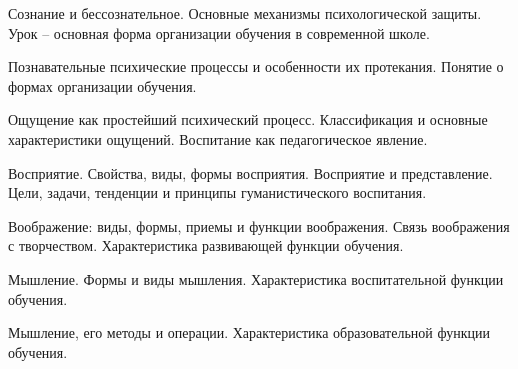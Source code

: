 \documentclass[
	14pt,
	a4paper,
	]
	{scrartcl}
\begin{document}
\newpage


\shapk
{}
\setcounter{zad}{0}

\vfill
\z 	Сознание и бессознательное. Основные механизмы психологической защиты.
 \vfill
\z 	Урок – основная форма организации обучения в современной школе.
 \vfill

\vfill

\newpage


\shapk
{}
\setcounter{zad}{0}

\vfill
\z 	Познавательные психические процессы и особенности их протекания.
 \vfill
\z 	Понятие о формах организации обучения.
 \vfill

\vfill

\newpage


\shapk
{}
\setcounter{zad}{0}

\vfill
\z 	Ощущение как простейший психический процесс. Классификация и основные характеристики ощущений.
 \vfill
\z 	Воспитание как педагогическое явление.
 \vfill

\vfill

\newpage


\shapk
{}
\setcounter{zad}{0}

\vfill
\z 	Восприятие. Свойства, виды, формы восприятия. Восприятие и представление.
 \vfill
\z 	Цели, задачи, тенденции и принципы гуманистического воспитания.
 \vfill

\vfill

\newpage


\shapk
{}
\setcounter{zad}{0}

\vfill
\z 	Воображение: виды, формы, приемы и функции воображения. Связь воображения с творчеством.
 \vfill
\z 	Характеристика развивающей функции обучения.
 \vfill

\vfill

\newpage


\shapk
{}
\setcounter{zad}{0}

\vfill
\z 	Мышление. Формы и виды мышления.
 \vfill
\z 	Характеристика воспитательной функции обучения.
 \vfill

\vfill

\newpage


\shapk
{}
\setcounter{zad}{0}

\vfill
\z 	Мышление, его методы  и операции.
 \vfill
\z 	Характеристика образовательной функции обучения.
 \vfill
\end{document}

